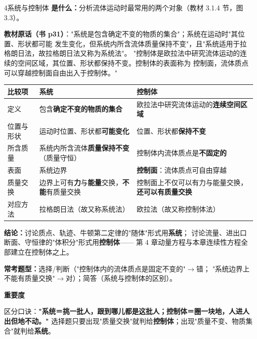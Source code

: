 \begin{kaodian}{4}{系统与控制体}
\textbf{是什么：}分析流体运动时最常用的两个对象（教材 3.1.4 节，图 3.3）。

\textbf{教材原话（书 p31）}："系统是包含确定不变的物质的集合"；系统在运动时"其位置、形状都可能
发生变化，但系统内所含流体质量保持不变"，且"系统适用于拉格朗日法，故拉格朗日法又称为系统法"。
"控制体是欧拉法中研究流体运动的连续的空间区域，其位置、形状都保持不变。控制体的表面称为
控制面，流体质点可以穿越控制面自由出入于控制体。"

\begin{center}
\begin{tabularx}{\textwidth}{@{}lXX@{}}
\toprule
比较项 & 系统 & 控制体 \\
\midrule
定义 & 包含\textbf{确定不变的物质的集合} & 欧拉法中研究流体运动的\textbf{连续空间区域} \\
位置与形状 & 运动时位置、形状都\textbf{可能变化} & 位置、形状都\textbf{保持不变} \\
所含质量 & 系统内所含流体\textbf{质量保持不变}（质量守恒） & 控制体内流体质点是\textbf{不固定的} \\
表面 & 系统边界 & \textbf{控制面}：流体质点可自由穿越 \\
质量交换 & 边界上可有\textbf{力}与\textbf{能量}交换，\textbf{不能}有质量交换 & 控制面上不仅可以有力与能量交换，\textbf{还可以有质量交换} \\
对应方法 & 拉格朗日法（故又称系统法） & 欧拉法（故又称控制体法） \\
\bottomrule
\end{tabularx}
\end{center}

\textbf{结论：}讨论质点、轨迹、牛顿第二定律的"随体"形式用\textbf{系统}；
讨论流量、进出口断面、守恒律的"体积分"形式用\textbf{控制体}——
第 4 章动量方程与本章连续性方程全部建立在控制体之上。

\textbf{常考题型：}选择/判断（"控制体内的流体质点是固定不变的"$\to$错；
"系统边界上不能有质量交换"$\to$对）；简答（系统与控制体的区别）。

\textbf{重要度 }\quad{}\quad{}

\begin{banfa}
区分口诀：\textbf{"系统＝挑一批人，跟到哪儿都是这批人；控制体＝圈一块地，人进人出但地不动。"}
选择题只要出现"质量交换"就判给\textbf{控制体}；出现"质量不变、物质集合"就判给\textbf{系统}。
\end{banfa}
\end{kaodian}

